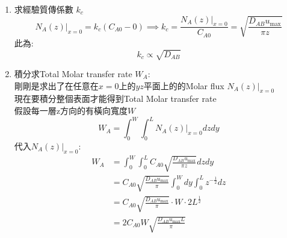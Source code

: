 \documentclass[../main.tex]{subfiles}
\begin{document}
\begin{itemize}
\begin{enumerate}
\begin{align}
      =& \frac{\sqrt{\pi}}{2} \cdot \frac{1}{2\sqrt{\frac{D_{AB}}{u_{\text{max}}}z}}
    \end{align}
    代入$N_A$:
    \begin{align}
      N_A(z)\big|_{x=0} &= -D_{AB}\frac{\partial C_A}{\partial x}\bigg|_{x=0} \nonumber\\
      &= -D_{AB} C_{A0} \cdot \frac{d}{dx}\text{erfc}(\eta)\bigg|_{x=0} \nonumber\\
      &= -D_{AB} C_{A0} \cdot \frac{d}{dx}\left[
        1- \text{erf}(\eta)
      \right]_{x=0} \nonumber\\
      &= D_{AB} C_{A0} \frac{2}{\sqrt{\pi}}\left[
        \frac{1}{2\sqrt{\frac{D_{AB}}{u_{\text{max}}}z}}
      \right] \nonumber\\
      &= \boxed{C_{A0} \sqrt{\frac{D_{AB} u_{\text{max}}}{\pi z}} }
    \end{align}
    \item 求經驗質傳係數 $k_c$
    \begin{equation}
      N_A(z)\big|_{x=0} = k_c (C_{A0}-0) \implies \boxed{k_c = \frac{N_A(z)\big|_{x=0}}{C_{A0}} 
      = \sqrt{\frac{D_{AB} u_{\text{max}}}{\pi z}}}
    \end{equation}
    此為:
    \begin{equation}
      k_c \propto \sqrt{D_{AB}}
    \end{equation}
    \item 積分求Total Molar transfer rate $W_A$:\\
    剛剛是求出了在任意在$x=0$上的$yz$平面上的的Molar flux $N_A(z)\big|_{x=0}$\\
    現在要積分整個表面才能得到Total Molar transfer rate\\
    假設每一層z方向的有橫向寬度$W$
    \begin{equation}
      W_A = \int_0^W\int_0^L N_A(z)\big|_{x=0} dz dy
    \end{equation}
    代入$N_A(z)\big|_{x=0}$:
    \begin{align}
      W_A &= \int_0^W\int_0^L C_{A0} \sqrt{\frac{D_{AB} u_{\text{max}}}{\pi z}} dz dy \nonumber\\
      &= C_{A0} \sqrt{\frac{D_{AB} u_{\text{max}}}{\pi}} \int_0^W dy \int_0^L z^{-\frac{1}{2}} dz \nonumber\\
      &= C_{A0} \sqrt{\frac{D_{AB} u_{\text{max}}}{\pi}} \cdot W \cdot 2L^{\frac{1}{2}} \nonumber\\
      &= \boxed{2 C_{A0} W \sqrt{\frac{D_{AB} u_{\text{max}} L}{\pi}}}
    \end{align}
  \end{enumerate}
\end{itemize}
\end{document}

